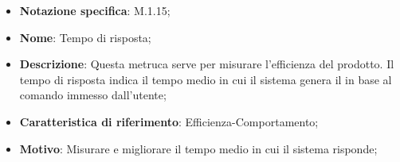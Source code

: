 \begin{itemize}
    \item \textbf{Notazione specifica}: M.1.15;
    \item \textbf{Nome}: Tempo di risposta;
    \item \textbf{Descrizione}: Questa metruca serve per misurare l’efficienza del prodotto. Il tempo di risposta indica il tempo medio in cui il sistema genera il  in base al comando immesso dall’utente;
    \item \textbf{Caratteristica di riferimento}: Efficienza-Comportamento;
    \item \textbf{Motivo}: Misurare e migliorare il tempo medio in cui il sistema risponde;
\end{itemize}
